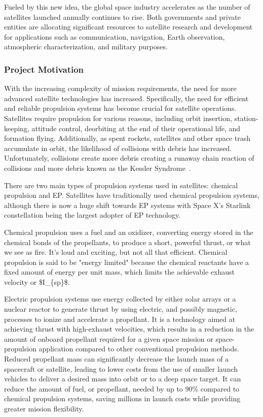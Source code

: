 Fueled by this new idea, the global space industry accelerates as the number of satellites launched annually continues to rise. Both governments and private entities are allocating significant resources to satellite research and development for applications such as communication, navigation, Earth observation, atmospheric characterization, and military purposes.

\subsubsection{Project Motivation}

With the increasing complexity of mission requirements, the need for more advanced satellite technologies has increased. Specifically, the need for efficient and reliable propulsion systems has become crucial for satellite operations. Satellites require propulsion for various reasons, including orbit insertion, station-keeping, attitude control, deorbiting at the end of their operational life, and formation flying. Additionally, as spent rockets, satellites and other space trash accumulate in orbit, the likelihood of collisions with debris has increased. Unfortunately, collisions create more debris creating a runaway chain reaction of collisions and more debris known as the Kessler Syndrome~\cite{nasa-kessler}.

There are two main types of propulsion systems used in satellites: chemical propulsion and \ac{EP}. Satellites have traditionally used chemical propulsion systems, although there is now a huge shift towards \ac{EP} systems with Space X's Starlink constellation being the largest adopter of EP technology.

Chemical propulsion uses a fuel and an oxidizer, converting energy stored in the chemical bonds of the propellants, to produce a short, powerful thrust, or what we see as fire. It’s loud and exciting, but not all that efficient. Chemical propulsion is said to be "energy limited" because the chemical reactants have a fixed amount of energy per unit mass, which limits the achievable exhaust velocity or \ac{$I_{sp}$}.

Electric propulsion systems use energy collected by either solar arrays or a nuclear reactor to generate thrust by using electric, and possibly magnetic, processes to ionize and accelerate a propellant. It is a technology aimed at achieving thrust with high-exhaust velocities, which results in a reduction in the amount of onboard propellant required for a given space mission or space-propulsion application compared to other conventional propulsion methods. Reduced propellant mass can significantly decrease the launch mass of a spacecraft or satellite, leading to lower costs from the use of smaller launch vehicles to deliver a desired mass into orbit or to a deep space target. \cite{fundamentals-of-electric-propulsion}
It can reduce the amount of fuel, or propellant, needed by up to 90\% compared to chemical propulsion systems, saving millions in launch costs while providing greater mission flexibility. \cite{nasa-electrifying-propulsion}

